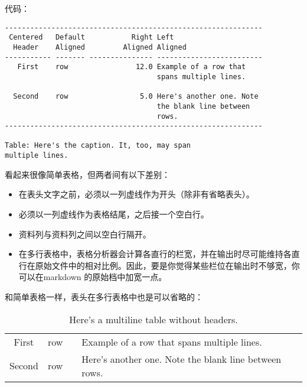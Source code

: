 \documentclass[cn]{elegantbook}
\providecommand{\tightlist}{%
  \setlength{\itemsep}{0pt}\setlength{\parskip}{0pt}}
\begin{document}
代码：

\begin{lstlisting}
-------------------------------------------------------------
 Centered   Default           Right Left
  Header    Aligned         Aligned Aligned
----------- ------- --------------- -------------------------
   First    row                12.0 Example of a row that
                                    spans multiple lines.

  Second    row                 5.0 Here's another one. Note
                                    the blank line between
                                    rows.
-------------------------------------------------------------

Table: Here's the caption. It, too, may span
multiple lines.
\end{lstlisting}

看起来很像简单表格，但两者间有以下差别：

\begin{itemize}
\tightlist
\item
  在表头文字之前，必须以一列虚线作为开头（除非有省略表头）。
\item
  必须以一列虚线作为表格结尾，之后接一个空白行。
\item
  资料列与资料列之间以空白行隔开。
\item
  在多行表格中，表格分析器会计算各直行的栏宽，并在输出时尽可能维持各直行在原始文件中的相对比例。因此，要是你觉得某些栏位在输出时不够宽，你可以在markdown
  的原始档中加宽一点。
\end{itemize}

和简单表格一样，表头在多行表格中也是可以省略的：

\begin{longtable}[]{@{}clrl@{}}
\caption{Here's a multiline table without headers.}\tabularnewline
\toprule
\endhead
\begin{minipage}[t]{0.15\columnwidth}\centering
First\strut
\end{minipage} & \begin{minipage}[t]{0.10\columnwidth}\raggedright
row\strut
\end{minipage} & \begin{minipage}[t]{0.20\columnwidth}\raggedleft
12.0\strut
\end{minipage} & \begin{minipage}[t]{0.32\columnwidth}\raggedright
Example of a row that spans multiple lines.\strut
\end{minipage}\tabularnewline
\begin{minipage}[t]{0.15\columnwidth}\centering
Second\strut
\end{minipage} & \begin{minipage}[t]{0.10\columnwidth}\raggedright
row\strut
\end{minipage} & \begin{minipage}[t]{0.20\columnwidth}\raggedleft
5.0\strut
\end{minipage} & \begin{minipage}[t]{0.32\columnwidth}\raggedright
Here's another one. Note the blank line between rows.\strut
\end{minipage}\tabularnewline
\bottomrule
\end{longtable}
\end{document}
